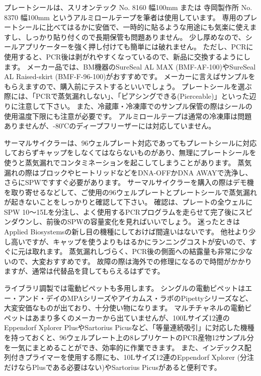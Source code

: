 \documentclass[titlepage,10pt,a4paper,uplatex]{jsbook}
\begin{document}
プレートシールは、スリオンテック No. 8160 幅100mm または 寺岡製作所 No. 8370 幅100mm というアルミロールテープを筆者は使用しています。
専用のプレートシールに比べてはるかに安価で、一時的に貼るような用途にも気楽に使えますし、しっかり貼り付くので長期保管も問題ありません。
少し厚めなので、シールアプリケーターを強く押し付けても簡単には破れません。
ただし、PCRに使用すると、PCR後は剥がれやすくなっているので、新品に交換するようにします。
メーカー品では、BM機器のSureSeal AL MAX (BMF-AF-100)やSureSeal AL Raised-skirt (BMF-F-96-100)がおすすめです。
メーカーに言えばサンプルをもらえますので、購入前にテストするといいでしょう。
プレートシールを選ぶ際には、「PCRで蒸気漏れしない」、「ピアシングできる(Pierceable)」といった辺りに注意して下さい。
また、冷蔵庫・冷凍庫でのサンプル保管の際はシールの使用温度下限にも注意が必要です。
アルミロールテープは通常の冷凍庫は問題ありませんが、-80℃のディープフリーザーには対応していません。

サーマルサイクラーは、96ウェルプレート対応であってもプレートシールに対応しておらずキャップをしなくてはならないものがあり、無理にプレートシールを使うと蒸気漏れでコンタミネーションを起こしてしまうことがあります。
蒸気漏れの際はブロックやヒートリッドなどをDNA-OFFかDNA AWAYで洗浄し、さらにSPWですすぐ必要があります。
サーマルサイクラーを購入の際はデモ機を取り寄せるなどして、ご使用の96ウェルプレートとプレートシールで蒸気漏れが起きないことをしっかりと確認して下さい。
確認は、プレートの全ウェルにSPW 10～15{\textmu}Lを分注し、よく使用するPCRプログラムを走らせて完了後にスピンダウンし、前後のSPWの容量変化を見ればいいでしょう。
迷ったときはApplied Biosystemsの新し目の機種にしておけば間違いはないです。
他社より少し高いですが、キャップを使うよりもはるかにランニングコストが安いので、すぐに元は取れます。
蒸気漏れしづらく、PCR後の側面への結露量も非常に少ないので、大変おすすめです。
故障の際は海外での修理になるので時間がかかりますが、通常は代替品を貸してもらえるはずです。

ライブラリ調製では電動ピペットも多用します。
シングルの電動ピペットはエー・アンド・デイのMPAシリーズやアイカムス・ラボのPipettyシリーズなど、大変安価なものが出ており、十分使い物になります。
マルチチャネルの電動ピペットはあまり多くのメーカーから出ていませんが、100{\textmu}Lサイズ12連のEppendorf Xplorer PlusやSartorius Picusなど、「等量連続吸引」に対応した機種を持っておくと、96ウェルプレート上の8レプリケートのPCR産物12サンプル分を一気にまとめることができ、効率的に作業できます。
また、インデックス配列付きプライマーを使用する際にも、10{\textmu}Lサイズ12連のEppendorf Xplorer (分注だけならPlusである必要はない)やSartorius Picusがあると便利です。
\end{document}
